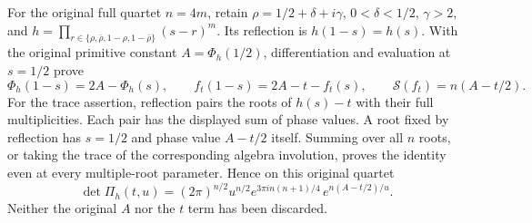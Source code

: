\documentclass[11pt,a4paper]{article}
\begin{document}
For the original full quartet $n=4m$, retain
$\rho=1/2+\delta+i\gamma$, $0<\delta<1/2$, $\gamma>2$, and
$h=\prod_{r\in\{\rho,\bar\rho,1-\rho,1-\bar\rho\}}(s-r)^m$.
Its reflection is $h(1-s)=h(s)$. With the original primitive constant
$A=\Phi_h(1/2)$, differentiation and evaluation at $s=1/2$ prove
\[
 \Phi_h(1-s)=2A-\Phi_h(s),\qquad
 f_t(1-s)=2A-t-f_t(s),\qquad
 \mathcal S(f_t)=n(A-t/2).
 \tag{PDE12}
\]
For the trace assertion, reflection pairs the roots of $h(s)-t$ with
their full multiplicities. Each pair has the displayed sum of phase
values. A root fixed by reflection has $s=1/2$ and phase value
$A-t/2$ itself. Summing over all $n$ roots, or taking the trace of the
corresponding algebra involution, proves the identity even at every
multiple-root parameter. Hence on this original quartet
\[
 \det\Pi_h(t,u)
  =(2\pi)^{n/2}u^{n/2}
       e^{3\pi i n(n+1)/4}\,e^{n(A-t/2)/u}.
 \tag{PDE13}
\]
Neither the original $A$ nor the $t$ term has been discarded.


\end{document}
